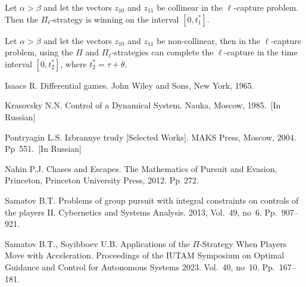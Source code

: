 \documentclass[12pt]{llncs}
\begin{document}
\begin{theorem}
Let $\alpha>\beta$ and let the vectors $z_{10}$ and $z_{11}$ be collinear in the $\ell$-capture problem. Then the $\Pi_\ell$-strategy is winning on the interval $[0, t^{*}_{1}]$.
\end{theorem}
\begin{theorem}
Let $\alpha>\beta$ and let the vectors $z_{10}$ and $z_{11}$ be non-collinear, then in the $\ell$-capture problem, using the $\Pi$ and $\Pi_\ell$-strategies can complete the $\ell$-capture in the time interval $[0,t^{*}_{2}]$, where $t^{*}_{2}=\tau+\theta$.
\end{theorem}
\begin{thebibliography}{9} %
 Isaacs R. Differential games. John Wiley and Sons, New York, 1965.

 Krasovsky N.N. Control of a Dynamical System. Nauka, Moscow, 1985.~[In Russian]

  Pontryagin L.S. Izbrannye trudy [Selected Works]. MAKS Press, Moscow, 2004. Pp~551.~[In Russian]

 Nahin P.J. Chases and Escapes. The Mathematics of Pursuit and Evasion, Princeton, Princeton University Press, 2012. Pp~272.

 Samatov B.T. Problems of group pursuit with integral constraints on controls of the players II. Cybernetics and
Systems Analysis. 2013, Vol.~49, no~6. Pp.~907--921.

 Samatov B.T., Soyibboev U.B. Applications of the $\Pi$-Strategy When Players Move with Acceleration. Proceedings of the IUTAM Symposium on Optimal Guidance and Control for Autonomous Systems 2023. Vol.~40, no~10. Pp.~167--181.

\end{thebibliography}
\end{document}
